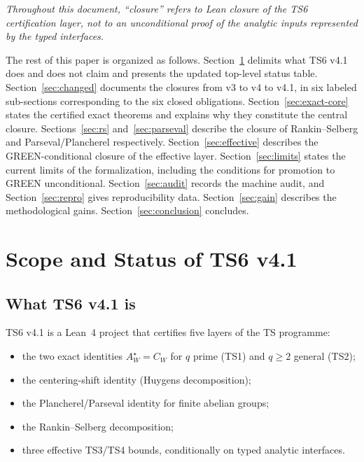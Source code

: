 \documentclass[11pt,a4paper]{article}
\theoremstyle{definition}
\newcommand{\AWs}{A_W^{\star}}
\newcommand{\CWq}{C_W}
\begin{document}
\smallskip

\noindent\emph{Throughout this document, ``closure'' refers to Lean closure of the TS6 certification layer, not to an unconditional proof of the analytic inputs represented by the typed interfaces.}

The rest of this paper is organized as follows. Section~\ref{sec:scope} delimits what TS6 v4.1 does and does not claim and presents the updated top-level status table. Section~\ref{sec:changed} documents the closures from v3 to v4 to v4.1, in six labeled sub-sections corresponding to the six closed obligations. Section~\ref{sec:exact-core} states the certified exact theorems and explains why they constitute the central closure. Sections~\ref{sec:rs} and~\ref{sec:parseval} describe the closure of Rankin--Selberg and Parseval/Plancherel respectively. Section~\ref{sec:effective} describes the GREEN-conditional closure of the effective layer. Section~\ref{sec:limits} states the current limits of the formalization, including the conditions for promotion to GREEN unconditional. Section~\ref{sec:audit} records the machine audit, and Section~\ref{sec:repro} gives reproducibility data. Section~\ref{sec:gain} describes the methodological gains. Section~\ref{sec:conclusion} concludes.

\section{Scope and Status of TS6 v4.1}\label{sec:scope}

\subsection{What TS6 v4.1 is}

TS6 v4.1 is a Lean~4 project that certifies five layers of the TS programme:
\begin{itemize}[noitemsep]
\item the two exact identities $\AWs = \CWq$ for $q$ prime (TS1) and $q \geq 2$ general (TS2);
\item the centering-shift identity (Huygens decomposition);
\item the Plancherel/Parseval identity for finite abelian groups;
\item the Rankin--Selberg decomposition;
\item three effective TS3/TS4 bounds, conditionally on typed analytic interfaces.
\end{itemize}
\end{document}
